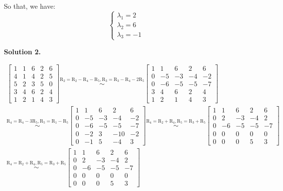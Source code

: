\documentclass[12pt]{article}
\newcommand{\solution}[1]{\noindent \textbf{Solution #1.}}
\begin{document}
  So that, we have:
  $$
  \left\{\begin{array}{l}
  \lambda_1=2 \\
  \lambda_2=6 \\
  \lambda_3=-1
  \end{array}\right.
  $$



\solution{2}

  \[
  \begin{array}{c}
  \left[\begin{array}{ccccc}
  1 & 1 & 6 & 2 & 6 \\
  4 & 1 & 4 & 2 & 5 \\
  5 & 2 & 3 & 5 & 0 \\
  3 & 4 & 6 & 2 & 4 \\
  1 & 2 & 1 & 4 & 3 
  \end{array}\right]
  \overset{\text{R}_2 = \text{R}_2 - \text{R}_4 - \text{R}_5,\text{R}_3 = \text{R}_3 - \text{R}_4 - 2\text{R}_5}{\sim}
  \left[\begin{array}{ccccc}
  1 & 1 & 6 & 2 & 6 \\
  0 & -5 & -3 & -4 & -2 \\
  0 & -6 & -5 & -5 & -7 \\
  3 & 4 & 6 & 2 & 4 \\
  1 & 2 & 1 & 4 & 3 
  \end{array}\right] \\
  \overset{\text{R}_4 = \text{R}_4 - 3\text{R}_5, \text{R}_5 = \text{R}_1 - \text{R}_5 }{\sim}
  \left[\begin{array}{ccccc}
  1 & 1 & 6 & 2 & 6 \\
  0 & -5 & -3 & -4 & -2 \\
  0 & -6 & -5 & -5 & -7 \\
  0 & -2 & 3 & -10 & -2 \\
  0 & -1 & 5 & -4 & 3 
  \end{array}\right]
  \overset{\text{R}_4 = \text{R}_2 + \text{R}_4, \text{R}_5 = \text{R}_3 + \text{R}_5 }{\sim}
  \left[\begin{array}{ccccc}
  1 & 1 & 6 & 2 & 6 \\
  0 & 2 & -3 & -4 & 2 \\
  0 & -6 & -5 & -5 & -7 \\
  0 & 0 & 0 & 0 & 0 \\
  0 & 0 & 0 & 5 & 3 
  \end{array}\right]
  \\ \overset{\text{R}_4 = \text{R}_2 + \text{R}_4, \text{R}_5 = \text{R}_3 + \text{R}_5 }{\sim}
  \left[\begin{array}{ccccc}
  1 & 1 & 6 & 2 & 6 \\
  0 & 2 & -3 & -4 & 2 \\
  0 & -6 & -5 & -5 & -7 \\
  0 & 0 & 0 & 0 & 0 \\
  0 & 0 & 0 & 5 & 3 
  \end{array}\right]
  \end{array}
  \]
\end{document}
